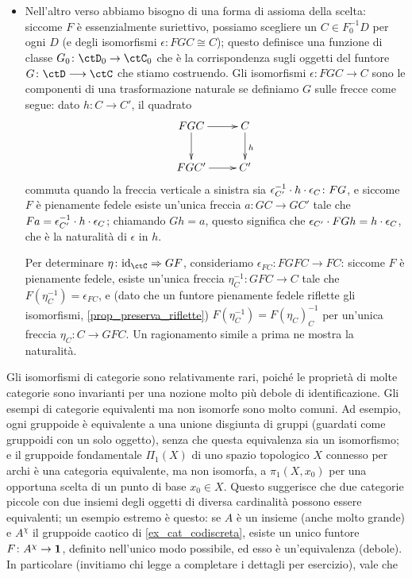 \begin{remark}
\begin{itemize}
        Ogni oggetto \(X\in\ctD_0\) poi è della forma \(F(GX) \cong X\) mediante l'isomorfismo (naturale in \(X\)!) dato da \(\epsilon\).
  \item Nell'altro verso abbiamo bisogno di una forma di assioma della scelta: siccome \(F\) è essenzialmente suriettivo, possiamo scegliere un \(C\in F_0^{-1}D\) per ogni \(D\) (e degli isomorfismi \(\epsilon \colon FGC \cong C\)); questo definisce una funzione di classe \(G_0 \colon \ctD_0\to\ctC_0\) che è la corrispondenza sugli oggetti del funtore \(G \colon \ctD\fun\ctC\) che stiamo costruendo. Gli isomorfismi \(\epsilon \colon FGC \to C\) sono le componenti di una trasformazione naturale se definiamo \(G\) sulle frecce come segue: dato \(h \colon C\to C'\), il quadrato
        \[\xymatrix{
          FGC \ar[r]\ar[d]& C \ar[d]^h\\
          FGC' \ar[r]& C'
         }\]
        commuta quando la freccia verticale a sinistra sia \(\epsilon_{C'}^{-1}\cdot h\cdot \epsilon_C \colon FG\), e siccome \(F\) è pienamente fedele esiste un'unica freccia \(a \colon GC \to GC'\) tale che \(Fa = \epsilon_{C'}^{-1}\cdot h\cdot \epsilon_C\); chiamando \(Gh=a\), questo significa che \(\epsilon_{C'}\cdot FGh = h\cdot \epsilon_C\), che è la naturalità di \(\epsilon\) in \(h\).

        Per determinare \(\eta \colon \Id[\ctC] \nat GF\), consideriamo \(\epsilon_{FC} \colon FGFC \to FC\): siccome \(F\) è pienamente fedele, esiste un'unica freccia \(\eta^{-1}_C \colon GFC\to C\) tale che \(F(\eta^{-1}_C) = \epsilon_{FC}\), e (dato che un funtore pienamente fedele riflette gli isomorfismi, \ref{prop_preserva_riflette}) \(F(\eta^{-1}_C)=F(\eta_C)^{-1}_C\) per un'unica freccia \(\eta_C \colon C\to GFC\). Un ragionamento simile a prima ne mostra la naturalità.
 \end{itemize}
\end{remark}
Gli isomorfismi di categorie sono relativamente rari, poiché le proprietà di molte categorie sono invarianti per una nozione molto più debole di identificazione.
Gli esempi di categorie equivalenti ma non isomorfe sono molto comuni. Ad esempio, ogni gruppoide è equivalente a una unione disgiunta di gruppi (guardati come gruppoidi con un solo oggetto), senza che questa equivalenza sia un isomorfismo; e il gruppoide fondamentale \(\Pi_1(X)\) di uno spazio topologico \(X\) connesso per archi è una categoria equivalente, ma non isomorfa, a \(\pi_1(X,x_0)\) per una opportuna scelta di un punto di base \(x_0\in X\). Questo suggerisce che due categorie piccole con due insiemi degli oggetti di diversa cardinalità possono essere equivalenti; un esempio estremo è questo: se \(A\) è un insieme (anche molto grande) e \(A^\chi\) il gruppoide caotico di \ref{ex_cat_codiscreta}, esiste un unico funtore \(F \colon A^\chi \to \mathbf{1}\), definito nell'unico modo possibile, ed esso è un'equivalenza (debole). In particolare (invitiamo chi legge a completare i dettagli per esercizio), vale che
